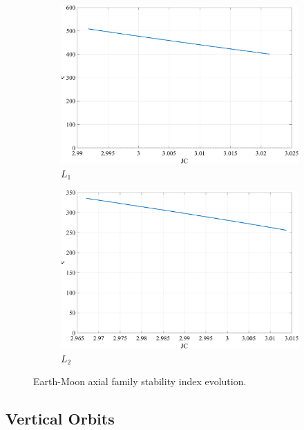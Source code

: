 \begin{figure}[ht]
    \begin{subfigure}[h]{0.4\linewidth}
        \includegraphics[width=\textwidth]{figures/L1AxialStability.pdf}
        \caption{$L_{1}$}
    \end{subfigure}
    \hfill
    \begin{subfigure}[h]{0.4\linewidth}
        \includegraphics[width=\textwidth]{figures/L2AxialStability.pdf}
        \caption{$L_{2}$}
    \end{subfigure}
    \caption{Earth-Moon axial family stability index evolution.}
    \label{fig:axialStability}
\end{figure}

\subsection{Vertical Orbits}
